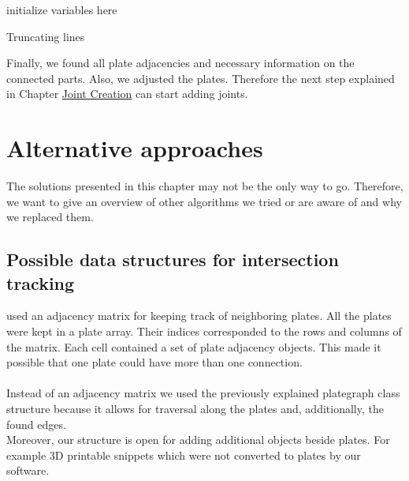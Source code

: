 \documentclass[../ClassicThesis.tex]{subfiles}
\begin{document}
\begin{algorithm}[H]
	\DontPrintSemicolon
	initialize variables here\;
  	\caption{Truncating lines}
  	\label{truncateLines}
\end{algorithm}

Finally, we found all plate adjacencies and necessary information on the connected parts. Also, we adjusted the plates. Therefore the next step explained in Chapter \hyperref[ch:joints]{Joint Creation} can start adding joints.

\section{Alternative approaches}
The solutions presented in this chapter may not be the only way to go. Therefore, we want to give an overview of other algorithms we tried or are aware of and why we replaced them.

\subsection{Possible data structures for intersection tracking}
\citeauthor{master-thesis} used an adjacency matrix for keeping track of neighboring plates. All the plates were kept in a plate array. Their indices corresponded to the rows and columns of the matrix. Each cell contained a set of plate adjacency objects. This made it possible that one plate could have more than one connection.\\
\*\\
Instead of an adjacency matrix we used the previously explained plategraph class structure because it allows for traversal along the plates and, additionally, the found edges. \\
Moreover, our structure is open for adding additional objects beside plates. For example 3D printable snippets which were not converted to plates by our software.
\end{document}
